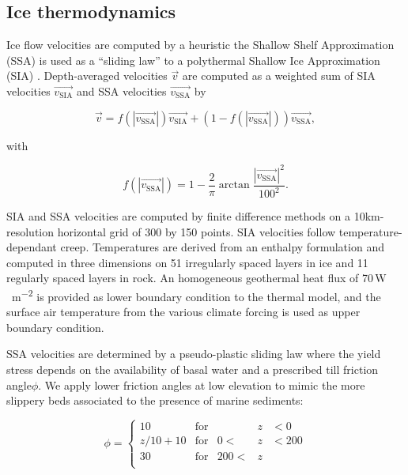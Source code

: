 \subsection{Ice thermodynamics}

Ice flow velocities are computed by a heuristic the Shallow Shelf Approximation (SSA) is used as a ``sliding law'' to a polythermal Shallow Ice Approximation (SIA) \citep{bueler-brown-2009}. Depth-averaged velocities $\vec{v}$ are computed as a weighted sum of SIA velocities $\vec{v_{\mathrm{SIA}}}$ and SSA velocities $\vec{v_{\mathrm{SSA}}}$ by

\begin{equation}
	\vec{v} = f(|\vec{v_{\mathrm{SSA}}}|)\vec{v_{\mathrm{SIA}}}
  + (1-f(|\vec{v_{\mathrm{SSA}}}|))\vec{v_{\mathrm{SSA}}},
\end{equation}

with

\begin{equation}
	f(|\vec{v_{\mathrm{SSA}}}|) = 1
	- \frac{2}{\pi}\arctan{\frac{|\vec{v_{\mathrm{SSA}}}|^2}{100^2}}.
\end{equation}

SIA and SSA velocities are computed by finite difference methods on a 10km-resolution horizontal grid of 300 by 150 points. SIA velocities follow temperature-dependant creep. Temperatures are derived from an enthalpy formulation \citep{aschwanden-etal-2012} and computed in three dimensions on 51 irregularly spaced layers in ice and 11 regularly spaced layers in rock. An homogeneous geothermal heat flux of 70\,\unit{W\,m^{-2}} is provided as lower boundary condition to the thermal model, and the surface air temperature from the various climate forcing is used as upper boundary condition.

SSA velocities are determined by a pseudo-plastic sliding law where the yield stress depends on the availability of basal water and a prescribed till friction angle$\phi$. We apply lower friction angles at low elevation to mimic the more slippery beds associated to the presence of marine sediments:

\begin{equation}
	\phi = \left\{\begin{array}{llrll}
		10      & \mathrm{for} &      &z&<  0 \\
		z/10+10 & \mathrm{for} &   0 <&z&<200 \\
		30      & \mathrm{for} & 200 <&z&     \\
	\end{array}\right.
\end{equation}

